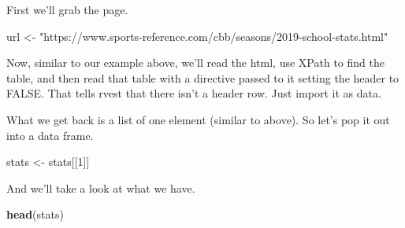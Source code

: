 \documentclass[
]{book}
\newenvironment{Shaded}{\begin{snugshade}}{\end{snugshade}}
\newcommand{\DataTypeTok}[1]{\textcolor[rgb]{0.13,0.29,0.53}{#1}}
\newcommand{\DecValTok}[1]{\textcolor[rgb]{0.00,0.00,0.81}{#1}}
\newcommand{\KeywordTok}[1]{\textcolor[rgb]{0.13,0.29,0.53}{\textbf{#1}}}
\newcommand{\NormalTok}[1]{#1}
\newcommand{\OperatorTok}[1]{\textcolor[rgb]{0.81,0.36,0.00}{\textbf{#1}}}
\newcommand{\OtherTok}[1]{\textcolor[rgb]{0.56,0.35,0.01}{#1}}
\newcommand{\StringTok}[1]{\textcolor[rgb]{0.31,0.60,0.02}{#1}}
\begin{document}
First we'll grab the page.

\begin{Shaded}
\begin{Highlighting}[]
\NormalTok{url <-}\StringTok{ "https://www.sports-reference.com/cbb/seasons/2019-school-stats.html"}
\end{Highlighting}
\end{Shaded}

Now, similar to our example above, we'll read the html, use XPath to find the table, and then read that table with a directive passed to it setting the header to FALSE. That tells rvest that there isn't a header row. Just import it as data.

\begin{Shaded}
\end{Shaded}

What we get back is a list of one element (similar to above). So let's pop it out into a data frame.

\begin{Shaded}
\begin{Highlighting}[]
\NormalTok{stats <-}\StringTok{ }\NormalTok{stats[[}\DecValTok{1}\NormalTok{]]}
\end{Highlighting}
\end{Shaded}

And we'll take a look at what we have.

\begin{Shaded}
\begin{Highlighting}[]
\KeywordTok{head}\NormalTok{(stats)}
\end{Highlighting}
\end{Shaded}
\end{document}
